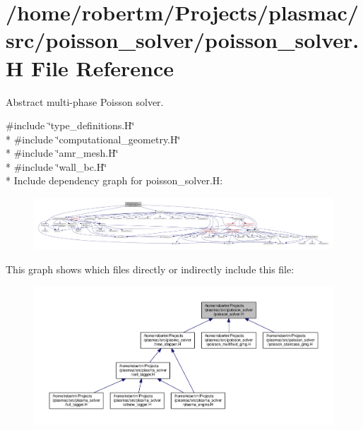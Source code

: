 \hypertarget{poisson__solver_8H}{}\section{/home/robertm/\+Projects/plasmac/src/poisson\+\_\+solver/poisson\+\_\+solver.H File Reference}
\label{poisson__solver_8H}


Abstract multi-\/phase Poisson solver.  


{\ttfamily \#include \char`\"{}type\+\_\+definitions.\+H\char`\"{}}\\*
{\ttfamily \#include \char`\"{}computational\+\_\+geometry.\+H\char`\"{}}\\*
{\ttfamily \#include \char`\"{}amr\+\_\+mesh.\+H\char`\"{}}\\*
{\ttfamily \#include \char`\"{}wall\+\_\+bc.\+H\char`\"{}}\\*
Include dependency graph for poisson\+\_\+solver.\+H\+:\nopagebreak
\begin{figure}[H]
\begin{center}
\leavevmode
\includegraphics[width=350pt]{poisson__solver_8H__incl}
\end{center}
\end{figure}
This graph shows which files directly or indirectly include this file\+:\nopagebreak
\begin{figure}[H]
\begin{center}
\leavevmode
\includegraphics[width=350pt]{poisson__solver_8H__dep__incl}
\end{center}
\end{figure}
